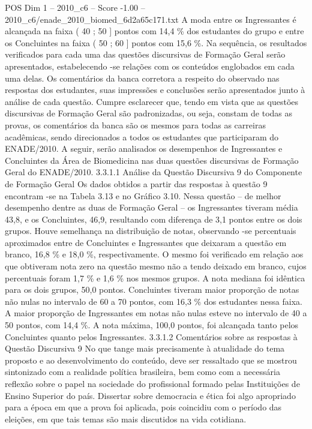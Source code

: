 \begin{textsample}{POS Dim 1 – 2010\_c6 – Score -1.00 – 2010\_c6/enade\_2010\_biomed\_6d2a65c171.txt}
A moda entre os Ingressantes é alcançada na faixa ( 40 ; 50 ] pontos com 14,4 \% dos estudantes do grupo e entre os Concluintes na faixa ( 50 ; 60 ] pontos com 15,6 \%.
Na sequência, os resultados verificados para cada uma das questões discursivas de Formação Geral serão apresentados, estabelecendo -se relações com os conteúdos englobados em cada uma delas.
Os comentários da banca corretora a respeito do observado nas respostas dos estudantes, suas impressões e conclusões serão apresentados junto à análise de cada questão.
Cumpre esclarecer que, tendo em vista que as questões discursivas de Formação Geral são padronizadas, ou seja, constam de todas as provas, os comentários da banca são os mesmos para todas as carreiras acadêmicas, sendo direcionados a todos os estudantes que participaram do ENADE/2010.
A seguir, serão analisados os desempenhos de Ingressantes e Concluintes da Área de Biomedicina nas duas questões discursivas de Formação Geral do ENADE/2010. 3.3.1.1 Análise da Questão Discursiva 9 do Componente de Formação Geral Os dados obtidos a partir das respostas à questão 9 encontram -se na Tabela 3.13 e no Gráfico 3.10.
Nessa questão – de melhor desempenho dentre as duas de Formação Geral – os Ingressantes tiveram média 43,8, e os Concluintes, 46,9, resultando com diferença de 3,1 pontos entre os dois grupos.
Houve semelhança na distribuição de notas, observando -se percentuais aproximados entre de Concluintes e Ingressantes que deixaram a questão em branco, 16,8 \% e 18,0 \%, respectivamente.
O mesmo foi verificado em relação aos que obtiveram nota zero na questão mesmo não a tendo deixado em branco, cujos percentuais foram 1,7 \% e 1,6 \% nos mesmos grupos.
A nota mediana foi idêntica para os dois grupos, 50,0 pontos.
Concluintes tiveram maior proporção de notas não nulas no intervalo de 60 a 70 pontos, com 16,3 \% dos estudantes nessa faixa.
A maior proporção de Ingressantes em notas não nulas esteve no intervalo de 40 a 50 pontos, com 14,4 \%.
A nota máxima, 100,0 pontos, foi alcançada tanto pelos Concluintes quanto pelos Ingressantes. 3.3.1.2 Comentários sobre as respostas à Questão Discursiva 9 No que tange mais precisamente à atualidade do tema proposto e ao desenvolvimento do conteúdo, deve ser ressaltado que se mostrou sintonizado com a realidade política brasileira, bem como com a necessária reflexão sobre o papel na sociedade do profissional formado pelas Instituições de Ensino Superior do país.
Dissertar sobre democracia e ética foi algo apropriado para a época em que a prova foi aplicada, pois coincidiu com o período das eleições, em que tais temas são mais discutidos na vida cotidiana.

\end{textsample}
